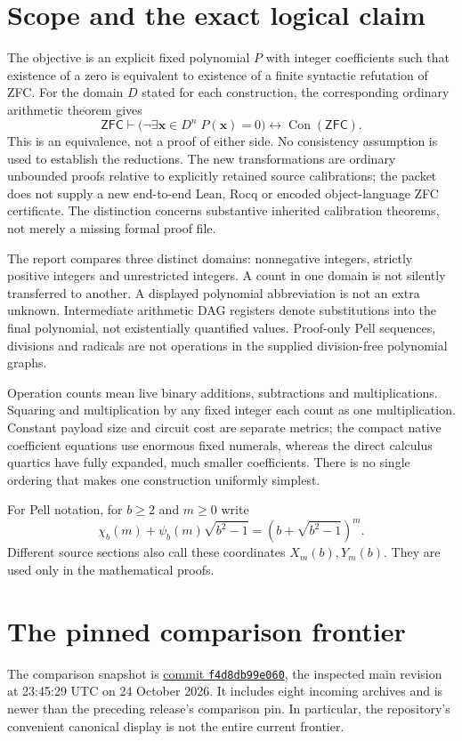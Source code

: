 \section{Scope and the exact logical claim}
The objective is an explicit fixed polynomial $P$ with integer coefficients
such that existence of a zero is equivalent to existence of a finite syntactic
refutation of ZFC. For the domain $D$ stated for each construction, the
corresponding ordinary arithmetic theorem gives
\[
 \mathsf{ZFC}\vdash
 \bigl(\neg\exists\mathbf x\in D^n\;P(\mathbf x)=0\bigr)
 \longleftrightarrow\operatorname{Con}(\mathsf{ZFC}).
\]
This is an equivalence, not a proof of either side. No consistency assumption
is used to establish the reductions. The new transformations are ordinary
unbounded proofs relative to explicitly retained source calibrations; the
packet does not supply a new end-to-end Lean, Rocq or encoded object-language
ZFC certificate. The distinction concerns substantive inherited calibration
theorems, not merely a missing formal proof file.

The report compares three distinct domains: nonnegative integers, strictly
positive integers and unrestricted integers. A count in one domain is not
silently transferred to another. A displayed polynomial abbreviation is not
an extra unknown. Intermediate arithmetic DAG registers denote substitutions
into the final polynomial, not existentially quantified values. Proof-only
Pell sequences, divisions and radicals are not operations in the supplied
division-free polynomial graphs.

Operation counts mean live binary additions, subtractions and multiplications.
Squaring and multiplication by any fixed integer each count as one
multiplication. Constant payload size and circuit cost are separate metrics;
the compact native coefficient equations use enormous fixed numerals, whereas
the direct calculus quartics have fully expanded, much smaller coefficients.
There is no single ordering that makes one construction uniformly simplest.

For Pell notation, for $b\ge2$ and $m\ge0$ write
\[
 \chi_b(m)+\psi_b(m)\sqrt{b^2-1}
   =(b+\sqrt{b^2-1})^m.
\]
Different source sections also call these coordinates $X_m(b),Y_m(b)$.
They are used only in the mathematical proofs.

\section{The pinned comparison frontier}
The comparison snapshot is
\href{https://github.com/VladimirReshetnikov/ProveIt/commit/f4d8db99e060339f3306a04d507c35bc1d0d68c5}{commit
\texttt{f4d8db99e060}}, the inspected main revision at 23:45:29 UTC on
24 October 2026. It includes eight incoming archives and is newer than the
preceding release's comparison pin. In particular, the repository's convenient
canonical display is not the entire current frontier.

